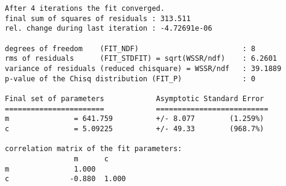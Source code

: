     \begin{verbatim}
After 4 iterations the fit converged.
final sum of squares of residuals : 313.511
rel. change during last iteration : -4.72691e-06

degrees of freedom    (FIT_NDF)                        : 8
rms of residuals      (FIT_STDFIT) = sqrt(WSSR/ndf)    : 6.2601
variance of residuals (reduced chisquare) = WSSR/ndf   : 39.1889
p-value of the Chisq distribution (FIT_P)              : 0

Final set of parameters            Asymptotic Standard Error
=======================            ==========================
m               = 641.759          +/- 8.077        (1.259%)
c               = 5.09225          +/- 49.33        (968.7%)

correlation matrix of the fit parameters:
                m      c      
m               1.000 
c              -0.880  1.000
    \end{verbatim}